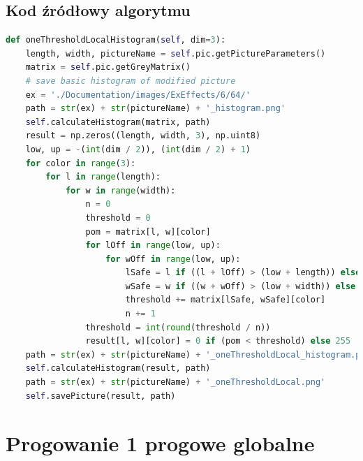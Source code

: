 \documentclass[a4paper,12pt, titlepage]{report}
\begin{document}
\subsection*{Kod źródłowy algorytmu}
\begin{lstlisting}[language=Python]
def oneThresholdLocalHistogram(self, dim=3):
    length, width, pictureName = self.pic.getPictureParameters()
    matrix = self.pic.getGreyMatrix()
    # save basic histogram of modified picture
    ex = './Documentation/images/ExEffects/6/64/'
    path = str(ex) + str(pictureName) + '_histogram.png'
    self.calculateHistogram(matrix, path)
    result = np.zeros((length, width, 3), np.uint8)
    low, up = -(int(dim / 2)), (int(dim / 2) + 1)
    for color in range(3):
        for l in range(length):
            for w in range(width):
                n = 0
                threshold = 0
                pom = matrix[l, w][color]
                for lOff in range(low, up):
                    for wOff in range(low, up):
                        lSafe = l if ((l + lOff) > (low + length)) else (l + lOff)
                        wSafe = w if ((w + wOff) > (low + width)) else (w + wOff)
                        threshold += matrix[lSafe, wSafe][color]
                        n += 1
                threshold = int(round(threshold / n))
                result[l, w][color] = 0 if (pom < threshold) else 255
    path = str(ex) + str(pictureName) + '_oneThresholdLocal_histogram.png'
    self.calculateHistogram(result, path)
    path = str(ex) + str(pictureName) + '_oneThresholdLocal.png'
    self.savePicture(result, path)
\end{lstlisting}

\section{Progowanie 1 progowe globalne}
\end{document}
